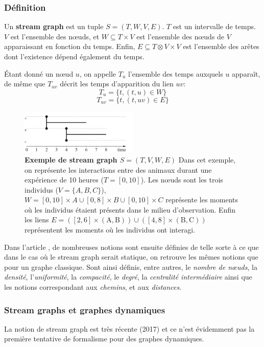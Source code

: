 \documentclass[11pt,a4paper]{article}
\theoremstyle{definition}
\theoremstyle{remark}
\theoremstyle{remark}
\def \stg {stream graph}
\def \Stgs {Stream graphs}
\begin{document}
\subsubsection{Définition}

Un \textbf{\stg{}} est un tuple $S=(T,W,V,E)$. $T$ est un intervalle de temps. $V$ est l'ensemble des nœuds, et $W \subseteq T \times V$ est l'ensemble des nœuds de $V$ apparaissant en fonction du temps. Enfin, $E \subseteq T \otimes V \times V$ est l'ensemble des arêtes dont l'existence dépend également du temps. 


Étant donné un nœud $u$, on appelle $T_u$ l'ensemble des temps auxquels $u$ apparaît, de même que $T_{uv}$ décrit les temps d'apparition du lien $uv$:
$$T_u=\{t, (t,u) \in W \}$$
$$ T_{uv}=\{t, (t,uv)\in E \} $$

\begin{figure}[H]
\centering
\includegraphics[width=0.5\textwidth]{exStreamGraph.JPG}
\caption{\textbf{Exemple de \stg{} $S=(T,V,W,E)$} Dans cet exemple, on représente les interactions entre des animaux durant une expérience de 10 heures ($T=[0,10]$). Les nœuds sont les trois individus ($V=\{A,B,C\}$), $W=[0,10]\times A \cup [0,8]\times B \cup [0,10]\times C$ représente les moments où les individus étaient présents dans le milieu d'observation. Enfin les liens $E=([2,6]\times (\text{A},\text{B})) \cup ([4,8]\times(\text{B},\text{C}))$ représentent les moments où les individus ont interagi.}
\label{exstreamgraph}
\end{figure}


Dans l'article \cite{stream}, de nombreuses notions sont ensuite définies de telle sorte à ce que dans le cas où le \stg{} serait statique, on retrouve les mêmes notions que pour un graphe classique. Sont ainsi définis, entre autres, le \textit{nombre de n\oe{}uds}, la \textit{densité}, l'\textit{uniformité}, la \textit{compacité}, le \textit{degré}, la \textit{centralité intermédiaire} ainsi que les notions correspondant aux \textit{chemins}, et aux \textit{distances}.

\subsubsection{\Stgs{} et graphes dynamiques}
La notion de \stg{} est très récente (2017)\cite{stream} et ce n'est évidemment pas la première tentative de formalisme pour des graphes dynamiques\cite{temporal}.
\end{document}
